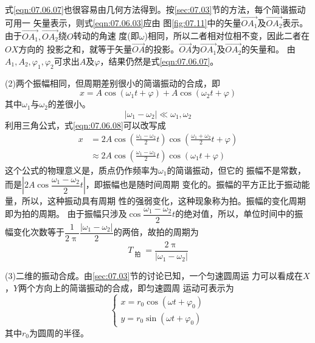 \documentclass[../outline-of-mechanics.tex]{subfiles}
\begin{document}
式\eqref{eqn:07.06.07}也很容易由几何方法得到。按\ref{sec:07.03}节的方法，每个简谐振动可用一
矢量表示，则式\eqref{eqn:07.06.03}应由
图\ref{fig:07.11}中的矢量$ \vec{OA_1} $及$ \vec{OA_2} $表示。由于$ \vec{ O A _ { 1 } } , \vec{ O A _ { 2 } } $绕$ O $转动的角速
度(即$ \omega $)相同，所以二者相对位相不变，因此二者在$ OX $方向的
投影之和，就等于矢量$\vec{OA}$的投影。$ \vec{OA} $为$\vec{OA_1}$及$\vec{OA_2}$的矢量和。
由$ A _ { 1 } , A _ { 2 } ,\varphi_{ 1 },\varphi_{ 2 }$可求出$ A $及$\varphi$，结果仍然是式\eqref{eqn:07.06.07}。

(2)两个振幅相同，但周期差别很小的简谐振动的合成，即
\begin{equation}\label{eqn:07.06.08}
  x = A \cos \left( \omega _ { 1 } t + \varphi \right) + A \cos \left( \omega _ { 2 } t + \varphi \right)
\end{equation}
其中$\omega_{ 1 }$与$\omega_{ 2 }$的差很小。
\begin{equation*}
  \left| \omega _ { 1 } - \omega _ { 2 } \right| \ll \omega _ { 1 } , \omega _ { 2 }
\end{equation*}
利用三角公式，式\eqref{eqn:07.06.08}可以改写成
\begin{equation*}
  \begin{split}
    x &= 2 A \cos \left( \frac { \omega _ { 1 } - \omega _ { 2 } } { 2 } t \right) \cos \left( \frac { \omega _ { 1 } + \omega _ { 2 } } { 2 } t + \varphi \right) \\
    & \approx 2 A \cos \left( \frac { \omega _ { 1 } - \omega _ { 2 } } { 2 } t \right) \cos \left( \omega _ { 1 } t + \varphi \right)
  \end{split}
\end{equation*}
这个公式的物理意义是，质点仍作频率为$\omega_{ 1 }$的简谐振动，但它的
振幅不是常数，而是$ \left| 2 A \cos \dfrac { \omega _ { 1 } - \omega _ { 2 } } { 2 } t \right| $，即振幅也是随时间周期
变化的。振幅的平方正比于振动能量，所以，这种振动具有周期
性的强弱变化，这种现象称为拍。振幅的变化周期即为拍的周期。
由于振幅只涉及$ \cos \dfrac { \omega _ { 1 } - \omega _ { 2 } } { 2 } t $的绝对值，所以，单位时间中的振
幅变化次数等于$ \dfrac { 1 } { 2 \uppi } \dfrac { \left| \omega _ { 1 } - \omega _ { 2 } \right| } { 2 } $的两倍，故拍的周期为
\begin{equation*}
  T _ { \text { 拍 } } = \frac { 2 \uppi } { \left| \omega _ { 1 } - \omega _ { 2 } \right| }
\end{equation*}

(3)二维的振动合成。由\ref{sec:07.03}节的讨论已知，一个匀速圆周运
力可以看成在$ X $，$ Y $两个方向上的简谐振动的合成，即匀速圆周
运动可表示为
\begin{equation}\label{eqn:07.06.09}
  \begin{cases}
    x = r _ { 0 } \cos \left( \omega t + \varphi _ { 0 } \right) \\
    y = r _ { 0 } \sin \left( \omega t + \varphi _ { 0 } \right)
  \end{cases}
\end{equation}
其中$ r _ { 0 } $为圆周的半径。
\end{document}
